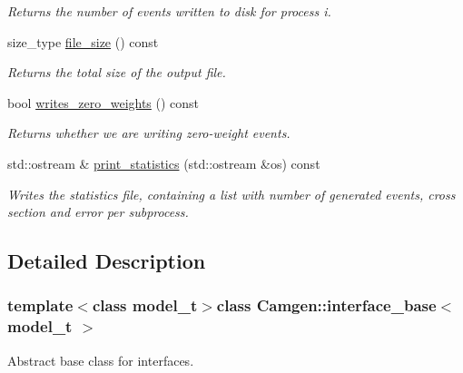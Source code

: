 \begin{DoxyCompactItemize}
\begin{DoxyCompactList}\small\item\em Returns the number of events written to disk for process i. \end{DoxyCompactList}\item 
\hypertarget{a00313_a361fefe2162c65d3d895d0cd883e3a15}{size\-\_\-type \hyperlink{a00313_a361fefe2162c65d3d895d0cd883e3a15}{file\-\_\-size} () const }\label{a00313_a361fefe2162c65d3d895d0cd883e3a15}

\begin{DoxyCompactList}\small\item\em Returns the total size of the output file. \end{DoxyCompactList}\item 
\hypertarget{a00313_a05a5504030f498f12c319e1ed0d069ad}{bool \hyperlink{a00313_a05a5504030f498f12c319e1ed0d069ad}{writes\-\_\-zero\-\_\-weights} () const }\label{a00313_a05a5504030f498f12c319e1ed0d069ad}

\begin{DoxyCompactList}\small\item\em Returns whether we are writing zero-\/weight events. \end{DoxyCompactList}\item 
std\-::ostream \& \hyperlink{a00313_a176422901fb2f6fcaa5b2d52fb211387}{print\-\_\-statistics} (std\-::ostream \&os) const 
\begin{DoxyCompactList}\small\item\em Writes the statistics file, containing a list with number of generated events, cross section and error per subprocess. \end{DoxyCompactList}\end{DoxyCompactItemize}


\subsection{Detailed Description}
\subsubsection*{template$<$class model\-\_\-t$>$class Camgen\-::interface\-\_\-base$<$ model\-\_\-t $>$}

Abstract base class for interfaces. 

